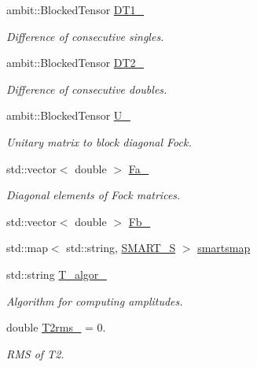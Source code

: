 \begin{DoxyCompactItemize}
ambit\+::\+Blocked\+Tensor \mbox{\hyperlink{classforte_1_1_m_r_d_s_r_g_a989be8fc78e76c66e6ea66ceb7b536f7}{D\+T1\+\_\+}}
\begin{DoxyCompactList}\small\item\em Difference of consecutive singles. \end{DoxyCompactList}\item 
ambit\+::\+Blocked\+Tensor \mbox{\hyperlink{classforte_1_1_m_r_d_s_r_g_a5d26d9ec7a2f256dc3e68db4f3849563}{D\+T2\+\_\+}}
\begin{DoxyCompactList}\small\item\em Difference of consecutive doubles. \end{DoxyCompactList}\item 
ambit\+::\+Blocked\+Tensor \mbox{\hyperlink{classforte_1_1_m_r_d_s_r_g_a5d8607020d51b1d4f2c999df48bcd6d7}{U\+\_\+}}
\begin{DoxyCompactList}\small\item\em Unitary matrix to block diagonal Fock. \end{DoxyCompactList}\item 
std\+::vector$<$ double $>$ \mbox{\hyperlink{classforte_1_1_m_r_d_s_r_g_ad4a27d44bd8e365503921442623e8b6e}{Fa\+\_\+}}
\begin{DoxyCompactList}\small\item\em Diagonal elements of Fock matrices. \end{DoxyCompactList}\item 
std\+::vector$<$ double $>$ \mbox{\hyperlink{classforte_1_1_m_r_d_s_r_g_a79cbd7d92e51471b67a488281ebbb396}{Fb\+\_\+}}
\item 
std\+::map$<$ std\+::string, \mbox{\hyperlink{classforte_1_1_m_r_d_s_r_g_ae11de126949a51f3c7f7978e3802cf1a}{S\+M\+A\+R\+T\+\_\+S}} $>$ \mbox{\hyperlink{classforte_1_1_m_r_d_s_r_g_a596c3d64a33a55bc52397468144e2833}{smartsmap}}
\item 
std\+::string \mbox{\hyperlink{classforte_1_1_m_r_d_s_r_g_a3b7db53a6ec42157e38ea3205d238b82}{T\+\_\+algor\+\_\+}}
\begin{DoxyCompactList}\small\item\em Algorithm for computing amplitudes. \end{DoxyCompactList}\item 
double \mbox{\hyperlink{classforte_1_1_m_r_d_s_r_g_a1c8168a992c9753463c6d495e2446eac}{T2rms\+\_\+}} = 0.
\begin{DoxyCompactList}\small\item\em R\+MS of T2. \end{DoxyCompactList}\item 

\end{DoxyCompactItemize}
